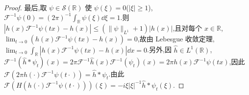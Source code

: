 \begin{proof}
最后,取 $\psi \in \mathcal{S}(\mathbb{R})$ 使 $\psi(\xi) = 0$($|\xi| \geq 1$),$\mathcal{F}^{-1}\psi(0) = (2\pi)^{-1}\int_{\mathbb{R}}\psi(\xi)\dd\xi = 1$.则 $|h(x)\mathcal{F}^{-1}\psi(tx) - h(x)| \leq (\| \psi \|_{L^{1}} + 1)|h(x)|$,且对每个 $x \in \mathbb{R}$,$\lim_{t \to 0}\left(h(x)\mathcal{F}^{-1}\psi(tx) - h(x)\right) = 0$,故由 Lebesgue 收敛定理,$\lim_{t \to 0}\int_{\mathbb{R}}|h(x)\mathcal{F}^{-1}\psi(tx) - h(x)|\dd x = 0$.另外,因 $\hat{h} \in L^{1}(\mathbb{R})$,$\mathcal{F}^{-1}(\hat{h} * \psi_{t})(x) = 2\pi\mathcal{F}^{-1}\hat{h}(x)\mathcal{F}^{-1}(\psi_{t})(x) = 2\pi h(x)\mathcal{F}^{-1}\psi(tx)$,因此 $\mathcal{F}\left(2\pi h(\cdot)\mathcal{F}^{-1}\psi(t\cdot)\right) = \hat{h} * \psi_{t}$.由此 $\mathcal{F}\left(H\left(h(\cdot)\mathcal{F}^{-1}\psi(t\cdot)\right)\right)(\xi) = -i\xi|\xi|^{-1}\hat{h} * \psi_{t}(\xi)$.


\end{proof}
